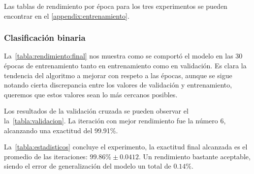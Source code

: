 Las tablas de rendimiento por época para los tres experimentos se pueden
encontrar en el \autoref{appendix:entrenamiento}.

\subsubsection{Clasificación binaria}

La~\autoref{tabla:rendimiento:final} nos muestra como se comportó el modelo
en las 30 épocas de entrenamiento tanto en entrenamiento como en validación. Es
clara la tendencia del algoritmo a mejorar con respeto a las épocas, aunque se
sigue notando cierta discrepancia entre los valores de validación y
entrenamiento, queremos que estos valores sean lo más cercanos posibles.

Los resultados de la validación cruzada se pueden observar el
la~\autoref{tabla:validacion}. La iteración con mejor rendimiento fue la número
6, alcanzando una exactitud del 99.91\%.

\begin{table}[H]
    \centering
    \caption{Resultados de la validación cruzada binaria}\label{tabla:validacion}
    \end{table}

La~\autoref{tabla:estadisticos} concluye el experimento, la exactitud final
alcanzada es el promedio de las iteraciones: \(99.86\% \pm 0.0412\). Un
rendimiento bastante aceptable, siendo el error de generalización del modelo un
total de \( 0.14\% \).

